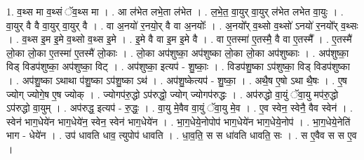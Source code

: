 \documentclass[17pt]{extarticle}
\begin{document}
1. व॒थ्स मा व॒थ्सं ॅव॒थ्स मा । . आ ल॑भेत लभे॒ता ल॑भेत । . ल॒भे॒त॒ वा॒युर् वा॒युर् ल॑भेत लभेत वा॒युः । . वा॒युर् वै वै वा॒युर् वा॒युर् वै । . वा अ॒नयो॑ र॒नयो॒र् वै वा अ॒नयोः᳚ । . अ॒नयो᳚र् व॒थ्सो व॒थ्सो॑ ऽनयो॑ र॒नयो᳚र् व॒थ्सः । . व॒थ्स इ॒म इ॒मे व॒थ्सो व॒थ्स इ॒मे । . इ॒मे वै वा इ॒म इ॒मे वै । . वा ए॒तस्मा॑ ए॒तस्मै॒ वै वा ए॒तस्मै᳚ । . ए॒तस्मै॑ लो॒का लो॒का ए॒तस्मा॑ ए॒तस्मै॑ लो॒काः । . लो॒का अप॑शुष्का॒ अप॑शुष्का लो॒का लो॒का अप॑शुष्काः । . अप॑शुष्का॒ विड् विडप॑शुष्का॒ अप॑शुष्का॒ विट् । . अप॑शुष्का॒ इत्यप॑ - शु॒ष्काः॒ । . विडप॑शु॒ष्का ऽप॑शुष्का॒ विड् विडप॑शुष्का । . अप॑शु॒ष्का ऽथाथा प॑शु॒ष्का ऽप॑शु॒ष्का ऽथ॑ । . अप॑शु॒ष्केत्यप॑ - शु॒ष्का॒ । . अथै॒ष ए॒षो ऽथा थै॒षः । . ए॒ष ज्योग् ज्योगे॒ष ए॒ष ज्योक् । . ज्योगप॑रु॒द्धो ऽप॑रुद्धो॒ ज्योग् ज्योगप॑रुद्धः । . अप॑रुद्धो वा॒युं ॅवा॒यु मप॑रु॒द्धो ऽप॑रुद्धो वा॒युम् । . अप॑रुद्ध॒ इत्यप॑ - रु॒द्धः॒ । . वा॒यु मे॒वैव वा॒युं ॅवा॒यु मे॒व । . ए॒व स्वेन॒ स्वेनै॒ वैव स्वेन॑ । . स्वेन॑ भाग॒धेये॑न भाग॒धेये॑न॒ स्वेन॒ स्वेन॑ भाग॒धेये॑न । . भा॒ग॒धेये॒नोपोप॑ भाग॒धेये॑न भाग॒धेये॒नोप॑ । . भा॒ग॒धेये॒नेति॑ भाग - धेये॑न । . उप॑ धावति धाव॒ त्युपोप॑ धावति । . धा॒व॒ति॒ स स धा॑वति धावति॒ सः । . स ए॒वैव स स ए॒व । \newline
\end{document}
